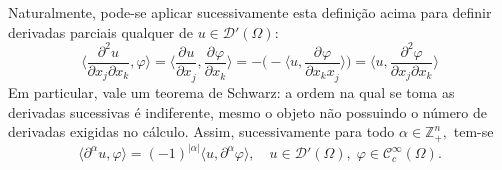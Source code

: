 \documentclass[../distribution_theory_notes.tex]{subfiles}
\begin{document}
\begin{example}
	Naturalmente, pode-se aplicar sucessivamente esta definição acima para definir derivadas parciais qualquer de \(u\in \mathcal{D}'(\Omega )\):
	\[
		\biggr\langle \frac{\partial^{2}u}{\partial x_{j}\partial x_{k}}, \varphi  \biggl\rangle = \biggl\langle \frac{\partial^{}u}{\partial x_{j}^{}}, \frac{\partial^{}\varphi }{\partial x_{k}^{}} \biggr\rangle = -\biggr(-\biggr\langle u, \frac{\partial^{}\varphi }{\partial x_{k} x_{j}^{}} \biggl\rangle \biggl) = \biggl\langle u, \frac{\partial^{2}\varphi }{\partial x_{j}\partial x_{k}} \biggr\rangle
	\]
	Em particular, vale um teorema de Schwarz: a ordem na qual se toma as derivadas sucessivas é indiferente, mesmo o objeto não possuindo o número de derivadas exigidas no cálculo. Assim, sucessivamente para todo \(\alpha \in \mathbb{Z}_{+}^{n},\) tem-se
	\[
		\langle \partial^{\alpha }u, \varphi  \rangle = (-1)^{| \alpha  |}\langle u, \partial^{\alpha}\varphi  \rangle, \quad u\in \mathcal{D}'(\Omega ),\; \varphi \in \mathcal{C}_{c}^{\infty}(\Omega ).
	\]

\end{example}
\end{document}
